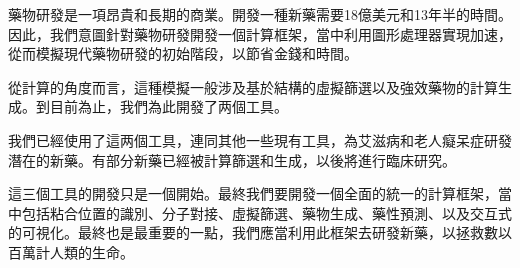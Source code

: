 藥物研發是一項昂貴和長期的商業。開發一種新藥需要18億美元和13年半的時間。因此，我們意圖針對藥物研發開發一個計算框架，當中利用圖形處理器實現加速，從而模擬現代藥物研發的初始階段，以節省金錢和時間。

從計算的角度而言，這種模擬一般涉及基於結構的虛擬篩選以及強效藥物的計算生成。到目前為止，我們為此開發了两個工具。

我們已經使用了這两個工具，連同其他一些現有工具，為艾滋病和老人癡呆症研發潛在的新藥。有部分新藥已經被計算篩選和生成，以後將進行臨床研究。

這三個工具的開發只是一個開始。最終我們要開發一個全面的統一的計算框架，當中包括粘合位置的識別、分子對接、虛擬篩選、藥物生成、藥性預測、以及交互式的可視化。最終也是最重要的一點，我們應當利用此框架去研發新藥，以拯救數以百萬計人類的生命。

